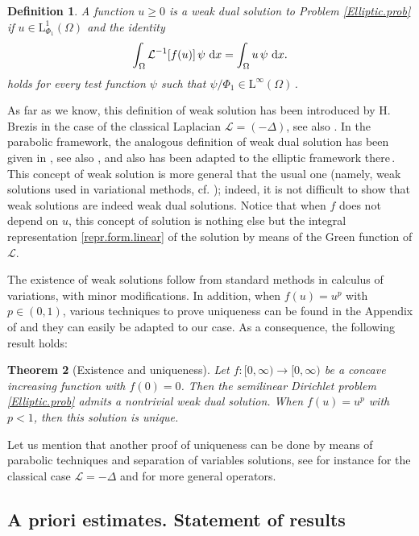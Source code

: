 \documentclass[11pt]{article}
\newtheorem{thm}{Theorem}[section]
\newtheorem{defn}[thm]{Definition}
\numberwithin{equation}{section}
\newcommand{\dx}{\,{\rm d}x}
\def\LL{\mathrm{L}} %
\newcommand{\A}{\mathcal{L}}
\newcommand{\AI}{\mathcal{L}^{-1}}
\begin{document}
\begin{defn}\label{Def.Very.Weak.Sol.Dual.elliptic} A function  $u\ge 0$   is a {\sl weak dual} solution to Problem \eqref{Elliptic.prob} if $u\in \LL^1_{\Phi_1}(\Omega)$ and the identity
\begin{equation}
\int_{\Omega}\AI [f(u)] \,\psi\,\dx
= \int_{\Omega} u\,\psi\,\dx.
\end{equation}
holds for every test function $\psi$ such that $\psi/\Phi_1\in \LL^\infty(\Omega)$\,.
\end{defn}
As far as we know, this definition of weak solution has been introduced by H. Brezis in the case of the classical Laplacian $\A=(-\Delta)$, see also \cite{DR-JFA}. In the parabolic framework, the analogous definition of weak dual solution has been given in \cite{BV-PPR1}, see also \cite{BV-PPR2-1,BSV2013}, and also has been adapted to the elliptic framework there\,.
This concept of weak solution is more general that the usual one (namely, weak solutions used in variational methods, cf.
\cite{BK92,CaSi1, CaSi2, CDDS, Ka, Tan});   indeed, it is not difficult to show that weak solutions are indeed weak dual solutions. Notice that when $f$ does not depend on $u$, this concept of solution is nothing else but the integral representation \eqref{repr.form.linear} of the solution by means of the Green function of $\A$.

The existence of weak solutions follow from standard methods in calculus of variations, with minor modifications. In addition, when $f(u)=u^p$ with $p\in (0,1)$, various techniques to prove uniqueness can be found in the Appendix of \cite{BK92} and they can easily be adapted to  our case. As a consequence, the following result holds:

\begin{thm}[Existence and uniqueness]
Let $f:[0,\infty)\to[0,\infty)$ be a concave increasing function with $f(0)=0$.
Then the semilinear Dirichlet problem \eqref{Elliptic.prob} admits a nontrivial weak dual solution. When $f(u)=u^p$ with $p<1$, then this solution is unique.
\end{thm}
Let us mention that another proof of uniqueness can be done by means of parabolic techniques and separation of variables solutions, see for instance
\cite{AP,JLVmonats} for the classical case $\A=-\Delta$ and \cite{BSV2013, BV-PPR2-1} for more general operators.



\subsection{A priori estimates. Statement of results}
\end{document}
